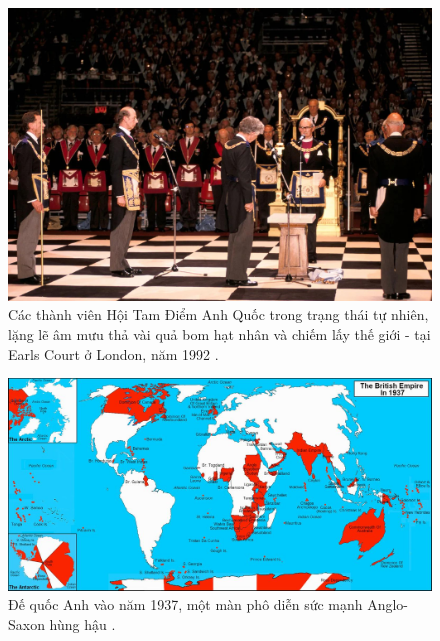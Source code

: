 \documentclass[10pt,twocolumn,letterpaper]{article}
\begin{document}
\begin{figure}[b]
\begin{center}
\includegraphics[width=1\linewidth]{freemason.jpg}
\end{center}
   \caption{Các thành viên Hội Tam Điểm Anh Quốc trong trạng thái tự nhiên, lặng lẽ âm mưu thả vài quả bom hạt nhân và chiếm lấy thế giới - tại Earls Court ở London, năm 1992 \cite{5}.}
\label{fig:1}
\label{fig:onecol}
\end{figure}

\begin{figure}[t]
\begin{center}
\includegraphics[width=1\textwidth]{british.jpg}
\end{center}
   \caption{Đế quốc Anh vào năm 1937, một màn phô diễn sức mạnh Anglo-Saxon hùng hậu \cite{14}.}
   \label{fig:2}
\end{figure}
\end{document}

